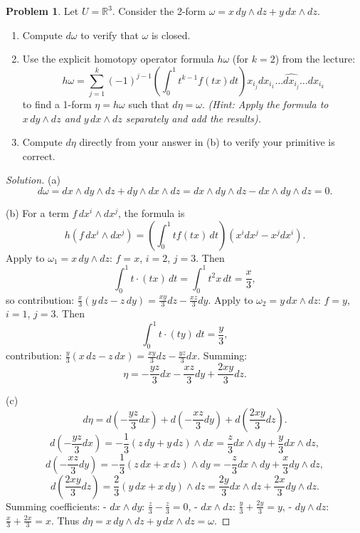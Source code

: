 \documentclass[12pt, a4paper]{article}
\theoremstyle{definition}
\newtheorem{problem}{Problem}
\newenvironment{solution}
  {\renewcommand\qedsymbol{$\blacksquare$}\begin{proof}[Solution]}
  {\end{proof}}
\begin{document}
\vfill\newpage

\begin{problem}
Let $U = \mathbb{R}^3$. Consider the 2-form $\omega = x \, dy \wedge dz + y \, dx \wedge dz$.
\begin{enumerate}
    \item[(a)] Compute $d\omega$ to verify that $\omega$ is closed.
    \item[(b)] Use the explicit homotopy operator formula $h\omega$ (for $k=2$) from the lecture:
    $$h\omega = \sum_{j=1}^k (-1)^{j-1} \left( \int_0^1 t^{k-1} f(tx) dt \right) x_{i_j} dx_{i_1} \dots \widehat{dx_{i_j}} \dots dx_{i_k}$$
    to find a 1-form $\eta = h\omega$ such that $d\eta = \omega$. \textit{(Hint: Apply the formula to $x \, dy \wedge dz$ and $y \, dx \wedge dz$ separately and add the results).}
    \item[(c)] Compute $d\eta$ directly from your answer in (b) to verify your primitive is correct.
\end{enumerate}
\end{problem}

\begin{solution}

(a)
\[
d\omega = dx\wedge dy\wedge dz + dy\wedge dx\wedge dz = dx\wedge dy\wedge dz - dx\wedge dy\wedge dz = 0.
\]

(b)
For a term \(f\,dx^{i}\wedge dx^{j}\), the formula is
\[
h(f\,dx^{i}\wedge dx^{j}) = \left(\int_{0}^{1} t f(tx)\,dt\right) \left(x^{i}dx^{j} - x^{j}dx^{i}\right).
\]
Apply to \(\omega_1 = x\,dy\wedge dz\): \(f=x\), \(i=2\), \(j=3\). Then
\[
\int_{0}^{1} t\cdot (tx)\,dt = \int_{0}^{1} t^{2}x\,dt = \frac{x}{3},
\]
so contribution: \(\frac{x}{3}(y\,dz - z\,dy) = \frac{xy}{3}dz - \frac{xz}{3}dy\).
Apply to \(\omega_2 = y\,dx\wedge dz\): \(f=y\), \(i=1\), \(j=3\). Then
\[
\int_{0}^{1} t\cdot (ty)\,dt = \frac{y}{3},
\]
contribution: \(\frac{y}{3}(x\,dz - z\,dx) = \frac{xy}{3}dz - \frac{yz}{3}dx\).
Summing:
\[
\eta = -\frac{yz}{3}dx - \frac{xz}{3}dy + \frac{2xy}{3}dz.
\]

(c)
\[
d\eta = d\left(-\frac{yz}{3}dx\right) + d\left(-\frac{xz}{3}dy\right) + d\left(\frac{2xy}{3}dz\right).
\]
\[
d\left(-\frac{yz}{3}dx\right) = -\frac{1}{3}(z\,dy + y\,dz)\wedge dx = \frac{z}{3}dx\wedge dy + \frac{y}{3}dx\wedge dz,
\]
\[
d\left(-\frac{xz}{3}dy\right) = -\frac{1}{3}(z\,dx + x\,dz)\wedge dy = -\frac{z}{3}dx\wedge dy + \frac{x}{3}dy\wedge dz,
\]
\[
d\left(\frac{2xy}{3}dz\right) = \frac{2}{3}(y\,dx + x\,dy)\wedge dz = \frac{2y}{3}dx\wedge dz + \frac{2x}{3}dy\wedge dz.
\]
Summing coefficients:
- \(dx\wedge dy\): \(\frac{z}{3} - \frac{z}{3} = 0\),
- \(dx\wedge dz\): \(\frac{y}{3} + \frac{2y}{3} = y\),
- \(dy\wedge dz\): \(\frac{x}{3} + \frac{2x}{3} = x\).
Thus \(d\eta = x\,dy\wedge dz + y\,dx\wedge dz = \omega\).
\end{solution}

\vfill
\end{document}
